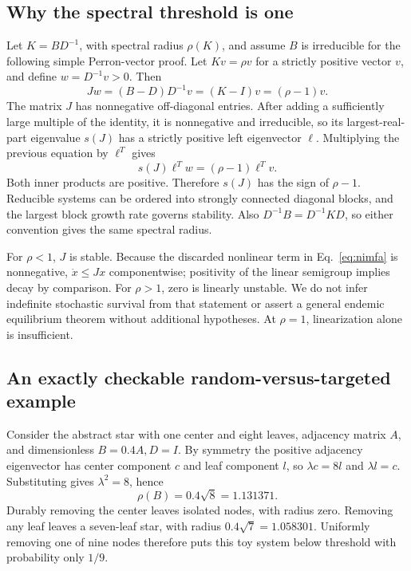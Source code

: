 \documentclass[11pt]{article}
\begin{document}
\subsection{Why the spectral threshold is one}
Let $K=BD^{-1}$, with spectral radius $\rho(K)$, and assume $B$ is irreducible for the following simple Perron-vector proof. Let $Kv=\rho v$ for a strictly positive vector $v$, and define $w=D^{-1}v>0$. Then
\begin{equation}
Jw=(B-D)D^{-1}v=(K-I)v=(\rho-1)v.
\end{equation}
The matrix $J$ has nonnegative off-diagonal entries. After adding a sufficiently large multiple of the identity, it is nonnegative and irreducible, so its largest-real-part eigenvalue $s(J)$ has a strictly positive left eigenvector $\ell$. Multiplying the previous equation by $\ell^T$ gives
\begin{equation}
s(J)\ell^Tw=(\rho-1)\ell^Tv.
\end{equation}
Both inner products are positive. Therefore $s(J)$ has the sign of $\rho-1$. Reducible systems can be ordered into strongly connected diagonal blocks, and the largest block growth rate governs stability. Also $D^{-1}B=D^{-1}KD$, so either convention gives the same spectral radius.

For $\rho<1$, $J$ is stable. Because the discarded nonlinear term in Eq.~\eqref{eq:nimfa} is nonnegative, $\dot x\le Jx$ componentwise; positivity of the linear semigroup implies decay by comparison. For $\rho>1$, zero is linearly unstable. We do not infer indefinite stochastic survival from that statement or assert a general endemic equilibrium theorem without additional hypotheses. At $\rho=1$, linearization alone is insufficient.

\subsection{An exactly checkable random-versus-targeted example}
Consider the abstract star with one center and eight leaves, adjacency matrix $A$, and dimensionless $B=0.4A,D=I$. By symmetry the positive adjacency eigenvector has center component $c$ and leaf component $l$, so $\lambda c=8l$ and $\lambda l=c$. Substituting gives $\lambda^2=8$, hence
\begin{equation}
\rho(B)=0.4\sqrt8=1.131371.
\end{equation}
Durably removing the center leaves isolated nodes, with radius zero. Removing any leaf leaves a seven-leaf star, with radius $0.4\sqrt7=1.058301$. Uniformly removing one of nine nodes therefore puts this toy system below threshold with probability only $1/9$.
\end{document}
